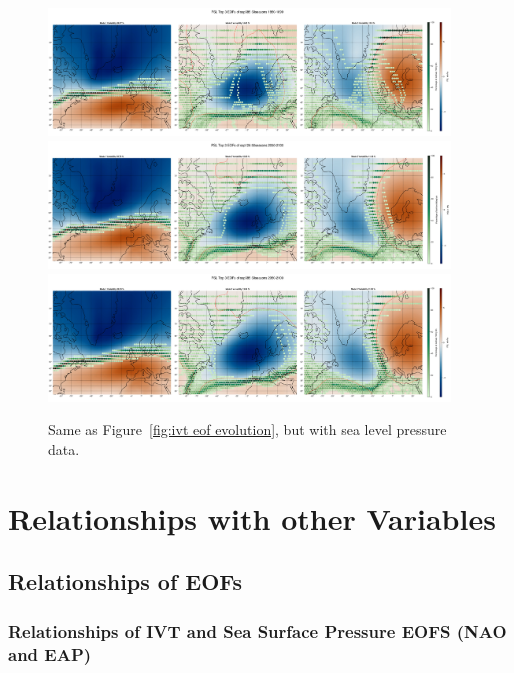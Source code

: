\begin{figure}
  \begin{center}
    \includegraphics[width=0.95\textwidth]{figures/psl_spat_patterns_hexbin_18501899_ssp585_50seasons.png}
    \includegraphics[width=0.95\textwidth]{figures/psl_spat_patterns_hexbin_20502100_ssp126_50seasons.png}
    \includegraphics[width=0.95\textwidth]{figures/psl_spat_patterns_hexbin_20502100_ssp585_50seasons.png}
  \end{center}
  \caption{Same as Figure~\ref{fig:ivt eof evolution}, but with sea level pressure data.}\label{fig:psl eof evolution}
\end{figure}

\section{Relationships with other Variables}



\subsection{Relationships of EOFs}


\subsubsection{Relationships of IVT and Sea Surface Pressure EOFS (NAO and EAP)}

